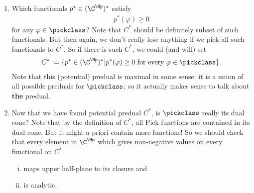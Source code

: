 \begin{enumerate}
	\item Which functionals $p^{*} \in (\C^{\Hp})^{*}$ satisfy
	\begin{align*}
		p^{*}(\varphi) \geq 0
	\end{align*}
	for any $\varphi \in \pickclass$? Note that $C^{*}$ should be definitely subset of such functionals. But then again, we don't really lose anything if we pick all such functionals to $C^{*}$. So if there is such $C^{*}$, we could (and will) set
	\begin{align*}
		C^{*} := \{p^{*} \in (\C^{\Hp})^{*} | p^{*}(\varphi) \geq 0 \text{ for every $\varphi \in \pickclass$}\}.
	\end{align*}
	Note that this (potential) predual is maximal in some sense: it is a union of all possible preduals for $\pickclass$; so it actually makes sense to talk about \textbf{the} predual.
	\item Now that we have found potential predual $C^{*}$, is $\pickclass$ really its dual cone? Note that by the definition of $C^{*}$, all Pick functions are contained in its dual cone. But it might a priori contain more functions! So we should check that every element in $\C^{\Hp}$ which gives non-negative values on every functional on $C^{*}$
	\begin{enumerate}[(i)]
		\item maps upper half-plane to its closure and
		\item is analytic.
	\end{enumerate}
\end{enumerate}

\begin{comment}
To further highlight the step $3$, let's return to the realm of $k$-tone functions for a while. Recall that we set out to define $k$-tone functions as a set of functions that are more or less functions with non-negative $k$'th derivative. So, why not just define them as the set of functions with non-negative $k$'th derivative? The problem is that such functions are rather fragile. They are, for instance, not closed under pointwise convergence. Now, one could try to run the above steps for such functions. Let's say we are investigating $k$-tone functions on $(a, b)$. At step $1$ one would observe that one should think about $(\R^{(a, b)})^{*}$ as some kind of piecewise polynomial functions. At step $2$ one could choose non-negative such functions as $C^{*}$. Or some subset of them: we chose Peano kernels. But at step $3$ there's a problem: we get more functions.
\end{comment}

